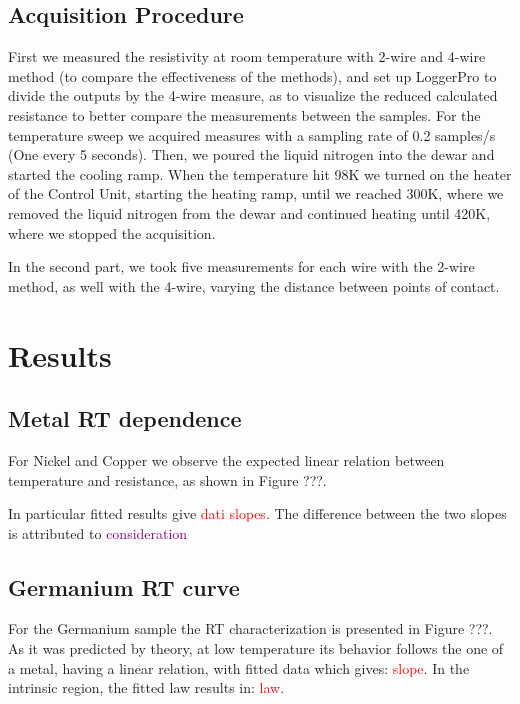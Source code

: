 \documentclass[a4paper,12pt]{article}
\begin{document}
\subsection*{Acquisition Procedure}
First we measured the resistivity at room temperature with 2-wire and 4-wire method (to compare the effectiveness of the methods), and set up LoggerPro to divide the outputs by the 4-wire measure, as to visualize the reduced calculated resistance to 
better compare the measurements between the samples. For the temperature sweep we acquired measures with a sampling rate of 0.2 samples/s (One every 5 seconds). 
Then, we poured the liquid nitrogen into the dewar and started the cooling ramp. When the temperature hit 98K we turned on the heater of the Control Unit, starting the heating ramp,
until we reached 300K, where we removed the liquid nitrogen from the dewar and continued heating until 420K, where we stopped the acquisition.\par 
In the second part, we took five measurements for each wire with the 2-wire method, as well with the 4-wire, varying the distance between points of contact.

\section{Results}
\subsection*{Metal RT dependence}
For Nickel and Copper we observe the expected linear relation between temperature and resistance, as shown in Figure ???.
\par In particular fitted results give \textcolor{red}{dati slopes}. 
The difference between the two slopes is attributed to \textcolor{purple}{consideration} 
\subsection*{Germanium RT curve}
For the Germanium sample the RT characterization is presented in Figure ???. As it was predicted by theory, at low temperature its behavior follows the one of a metal,
having a linear relation, with fitted data which gives: \textcolor{red}{slope}.
In the intrinsic region, the fitted law results in: \textcolor{red}{law}.
\end{document}
